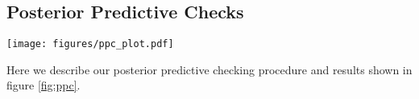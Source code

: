 \subsection{Posterior Predictive Checks} \label{sec:ppcs}

\begin{figure*}[ht!]
    \texttt{[image: figures/ppc\_plot.pdf]}
    \caption{Posterior Predictive Check}
    \label{fig:ppc}
\end{figure*}

Here we describe our posterior predictive checking procedure and results shown in figure \ref{fig:ppc}. 